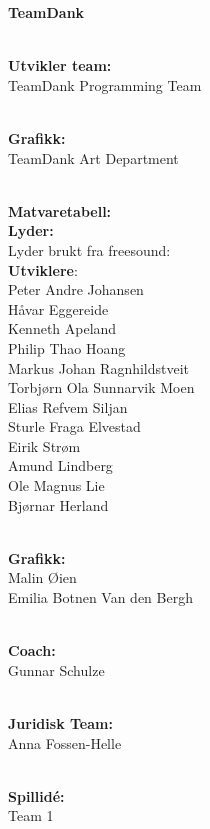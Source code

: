 \documentclass[paper=a4]{article}
\begin{document}
\begin{center} 
\textbf{TeamDank}\\ \

\textbf{Utvikler team:}\\
TeamDank Programming Team\\ \

\textbf{Grafikk:} \\
TeamDank Art Department \\ \


\textbf{Matvaretabell:} \\ 

\textbf{Lyder:} \\ 
Lyder brukt fra freesound: \\


\textbf{Utviklere}: \\
Peter Andre Johansen \\
Håvar Eggereide \\
Kenneth Apeland \\
Philip Thao Hoang \\
Markus Johan Ragnhildstveit \\
Torbjørn Ola Sunnarvik Moen \\
Elias Refvem Siljan \\
Sturle Fraga Elvestad \\
Eirik Strøm \\
Amund Lindberg \\
Ole Magnus Lie \\
Bjørnar Herland \\ \

\textbf{Grafikk:} \\
Malin Øien \\
Emilia Botnen Van den Bergh \\ \

\textbf{Coach:} \\
Gunnar Schulze \\ \ 

\textbf{Juridisk Team:} \\ 
Anna Fossen-Helle \\ \

\textbf{Spillidé:} \\
Team 1 \\

\end{center}
\end{document}
